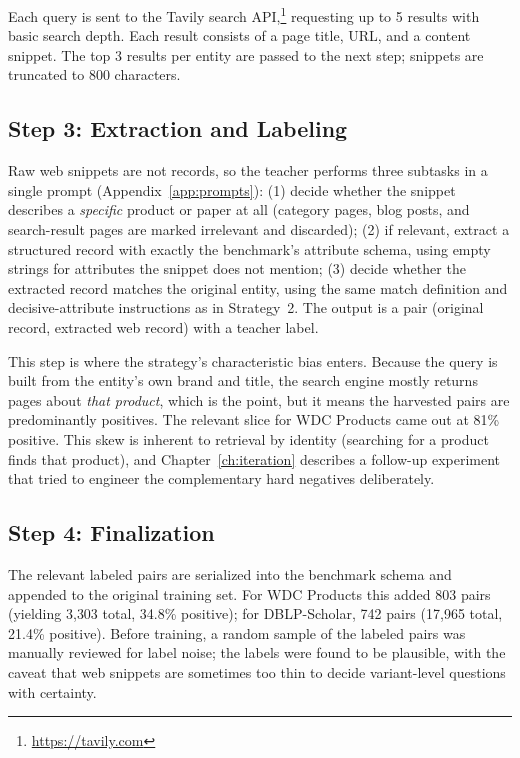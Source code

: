 \documentclass[a4paper,oneside,bibliography=totoc]{scrbook}
\begin{document}
Each query is sent to the Tavily search API,\footnote{\url{https://tavily.com}} requesting up to 5 results with basic search depth. Each result consists of a page title, URL, and a content snippet. The top 3 results per entity are passed to the next step; snippets are truncated to 800 characters.

\subsection{Step 3: Extraction and Labeling}
\label{sec:method_web_extract}

Raw web snippets are not records, so the teacher performs three subtasks in a single prompt (Appendix~\ref{app:prompts}): (1) decide whether the snippet describes a \emph{specific} product or paper at all (category pages, blog posts, and search-result pages are marked irrelevant and discarded); (2) if relevant, extract a structured record with exactly the benchmark's attribute schema, using empty strings for attributes the snippet does not mention; (3) decide whether the extracted record matches the original entity, using the same match definition and decisive-attribute instructions as in Strategy~2. The output is a pair (original record, extracted web record) with a teacher label.

This step is where the strategy's characteristic bias enters. Because the query is built from the entity's own brand and title, the search engine mostly returns pages about \emph{that product}, which is the point, but it means the harvested pairs are predominantly positives. The relevant slice for WDC Products came out at 81\% positive. This skew is inherent to retrieval by identity (searching for a product finds that product), and Chapter~\ref{ch:iteration} describes a follow-up experiment that tried to engineer the complementary hard negatives deliberately.

\subsection{Step 4: Finalization}
\label{sec:method_web_finalize}

The relevant labeled pairs are serialized into the benchmark schema and appended to the original training set. For WDC Products this added 803 pairs (yielding 3{,}303 total, 34.8\% positive); for DBLP-Scholar, 742 pairs (17{,}965 total, 21.4\% positive). Before training, a random sample of the labeled pairs was manually reviewed for label noise; the labels were found to be plausible, with the caveat that web snippets are sometimes too thin to decide variant-level questions with certainty.
\end{document}
